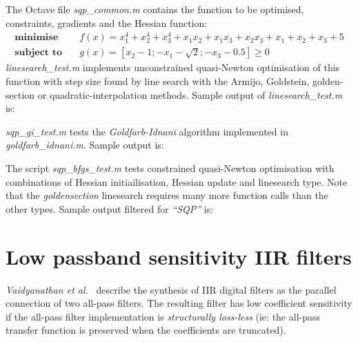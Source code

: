 \documentclass[a4paper,twoside,10pt,english]{report}
\begin{document}
The Octave file \emph{sqp\_common.m} contains the function to be optimised, 
constraints, gradients and the Hessian function:
\begin{align*}
\textbf{minimise}   \quad & f\left(x\right) = x_{1}^{4}+x_{2}^{4}+x_{3}^{4}+x_{1}x_{2}+x_{1}x_{3}+x_{2}x_{3}+x_{1}+x_{2}+x_{3}+5\\
\textbf{subject to} \quad & g\left(x\right) = \left[x_{2}-1;-x_{1}-\sqrt{2};-x_{3}-0.5\right]\ge0
\end{align*}
\emph{linesearch\_test.m} implements unconstrained quasi-Newton optimisation
of this function with step size found by line search with the Armijo,
Goldstein, golden-section or quadratic-interpolation methods.
Sample output of \emph{linesearch\_test.m} is:
\begin{small}

\end{small}
\emph{sqp\_gi\_test.m} tests the \emph{Goldfarb-Idnani} algorithm implemented
in \emph{goldfarb\_idnani.m}. Sample output is:
\begin{small}

\end{small}
The script \emph{sqp\_bfgs\_test.m} tests constrained quasi-Newton
optimisation with combinations of Hessian initiailisation, Hessian
update and linesearch type. Note that the \emph{goldensection} linesearch 
requires many more function calls than the other types. Sample output
filtered for \emph{``SQP''} is:
\begin{small}

\end{small}
\cleardoublepage{}
\chapter{\label{app:Low-passband-sensitivity-IIR-digital-filters}Low passband sensitivity IIR filters}
\emph{Vaidyanathan et al.}~\cite{VaidyanathanMitraNuevo_LowSensitivityIIRDigitalFilters, VaidyanathanMitra_LowPassbandSensitivityDigitalFilters}
describe the synthesis of IIR digital filters as the parallel connection
of two all-pass filters. The resulting filter has low coefficient
sensitivity if the all-pass filter implementation is \emph{structurally
loss-less} (ie: the all-pass transfer function is preserved when the 
coefficients are truncated).
\end{document}
